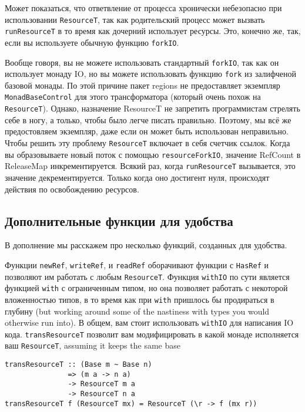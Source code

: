 Может показаться, что ответвление от процесса хронически небезопасно при использовании 
\lstinline'ResourceT', так как родительский процесс может вызвать
\lstinline'runResourceT' в то время
как дочерний использует ресурсы. Это, конечно же, так, если вы используете обычную
функцию \lstinline'forkIO'.

Вообще говоря, вы не можете использовать стандартный \lstinline'forkIO', так как он
использует монаду
IO, но вы можете использовать функцию \lstinline'fork' из залифченой базовой монады.
По этой причине пакет regions не предоставляет экземпляр \lstinline'MonadBaseControl' для
этого
трансформатора (который очень похож на \lstinline'ResourceT'). Однако, назначение
ResourceT
не запретить программистам стрелять себе в ногу, а только, чтобы было легче писать
правильно. Поэтому, мы всё же предостовляем экземпляр, даже если он может быть
использован неправильно. Чтобы решить эту проблему \lstinline'ResourceT' включает в себя
счетчик ссылок. Когда вы образовываете новый поток с помощью \lstinline'resourceForkIO',
значение RefCount в ReleaseMap инкрементируется. Всякий раз, когда
\lstinline'runResourceT'
вызывается, это значение декрементируется. Только когда оно достигент нуля, происходят
действия по освобождению ресурсов.
 
\subsection{Дополнительные функции для удобства}

В дополнение мы расскажем про несколько функций, созданных для удобства.
   
Функции \verb=newRef=, \verb=writeRef=, и \verb=readRef= оборачивают
функции с \lstinline'HasRef' и позволяют им работать с любым \lstinline'ResourceT'.
Функция \verb=withIO= по сути является функцией \verb=with= с ограниченным типом, но она 
позволяет работать с некоторой вложенностью типов, в то время как при \verb=with=
пришлось бы продираться в глубину (but working around 
some of the nastiness with types you would otherwise run into). В общем, вам стоит
использовать \lstinline'withIO' для написания IO кода.
\verb=transResourceT= позволит вам модифицировать в какой монаде исполняется ваш
\verb=ResourceT=, assuming it keeps the same base
\begin{lstlisting}
transResourceT :: (Base m ~ Base n)
               => (m a -> n a)
               -> ResourceT m a
               -> ResourceT n a
transResourceT f (ResourceT mx) = ResourceT (\r -> f (mx r))
\end{lstlisting}  

